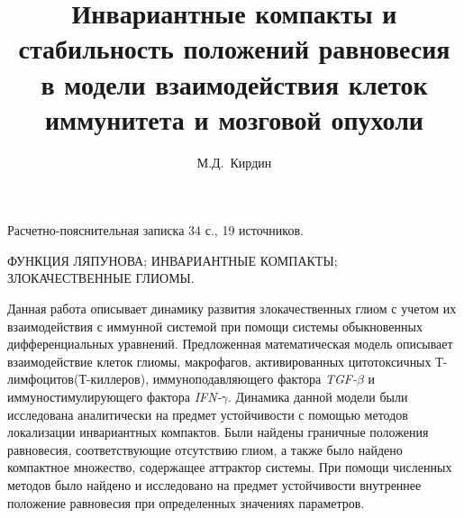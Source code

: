 \documentclass[14pt,a4paper]{extarticle}
\title{Инвариантные компакты и стабильность положений равновесия в модели взаимодействия клеток иммунитета и мозговой опухоли}
\author{М.Д.~Кирдин}
\begin{document}
	\maketitle
	
	\begin{annotation}
	
	Расчетно-пояснительная записка 34 с., 19  источников.
	
	\MakeUppercase{функция Ляпунова; инвариантные компакты; злокачественные глиомы.}
	
	Данная работа описывает динамику развития злокачественных глиом с учетом их взаимодействия с иммунной системой при помощи системы обыкновенных дифференциальных уравнений. Предложенная математическая модель описывает взаимодействие клеток глиомы, макрофагов, активированных цитотоксичных Т-лимфоцитов(Т-киллеров), иммуноподавляющего фактора \textit{TGF-}$\beta$ и иммуностимулирующего фактора \textit{IFN-}$\gamma$. Динамика данной модели были исследована аналитически на предмет устойчивости с помощью методов локализации инвариантных компактов. Были найдены граничные положения равновесия, соответствующие отсутствию глиом, а также было найдено компактное множество, содержащее аттрактор системы. При помощи численных методов было найдено и исследовано на предмет устойчивости внутреннее положение равновесия при определенных значениях параметров.
	
	\end{annotation}
	
	\tableofcontents
	
\end{document}
